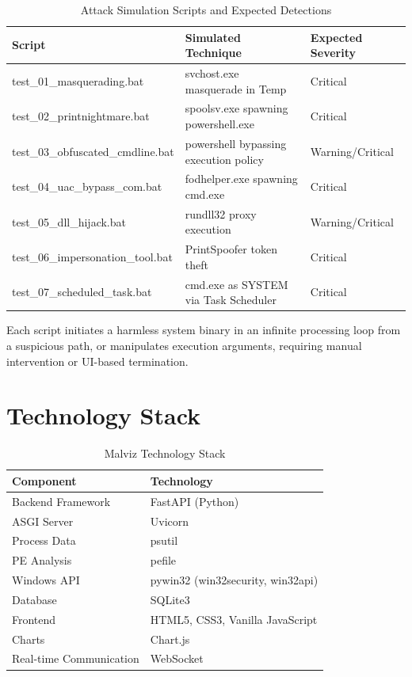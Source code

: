 \begin{table}[H]
\centering
\begin{tabular}{|l|l|l|}
\hline
\textbf{Script} & \textbf{Simulated Technique} & \textbf{Expected Severity} \\
\hline
test\_01\_masquerading.bat & svchost.exe masquerade in Temp & Critical \\
test\_02\_printnightmare.bat & spoolsv.exe spawning powershell.exe & Critical \\
test\_03\_obfuscated\_cmdline.bat & powershell bypassing execution policy & Warning/Critical \\
test\_04\_uac\_bypass\_com.bat & fodhelper.exe spawning cmd.exe & Critical \\
test\_05\_dll\_hijack.bat & rundll32 proxy execution & Warning/Critical \\
test\_06\_impersonation\_tool.bat & PrintSpoofer token theft & Critical \\
test\_07\_scheduled\_task.bat & cmd.exe as SYSTEM via Task Scheduler & Critical \\
\hline
\end{tabular}
\caption{Attack Simulation Scripts and Expected Detections}
\end{table}

Each script initiates a harmless system binary in an infinite processing loop from a suspicious path, or manipulates execution arguments, requiring manual intervention or UI-based termination.

\section{Technology Stack}

\begin{table}[H]
\centering
\begin{tabular}{|l|l|}
\hline
\textbf{Component} & \textbf{Technology} \\
\hline
Backend Framework & FastAPI (Python) \\
ASGI Server & Uvicorn \\
Process Data & psutil \\
PE Analysis & pefile \\
Windows API & pywin32 (win32security, win32api) \\
Database & SQLite3 \\
Frontend & HTML5, CSS3, Vanilla JavaScript \\
Charts & Chart.js \\
Real-time Communication & WebSocket \\
\hline
\end{tabular}
\caption{Malviz Technology Stack}
\end{table}

